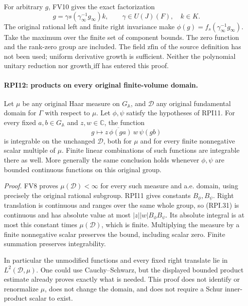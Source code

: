 For arbitrary \(g\), FV10 gives the exact factorization
\[
       g=\gamma s(\gamma_\infty^{-1}g_\infty)k,
       \qquad \gamma\in U(J)(F),\quad k\in K.
 \tag{RPI.30}
\]
The original rational left and finite right invariance
make \(\phi(g)=f_s(\gamma_\infty^{-1}g_\infty)\).
Take the maximum over the finite set of component bounds.
The zero function and the rank-zero group are included.
The field \(\mathrm{zfin}\) of the source definition has
not been used; uniform derivative growth is sufficient.
Neither the polynomial unitary reduction nor
\(\mathrm{growth\_iff}\) has entered this proof.

\paragraph{RPI12: products on every original finite-volume domain.}
\label{claim:RPI12}
Let \(\mu\) be any original Haar measure on \(G_{\mathbb A}\),
and \(\mathcal D\) any original fundamental domain for
\(\Gamma\) with respect to \(\mu\).  Let
\(\phi,\psi\) satisfy the hypotheses of RPI11.
For every fixed \(a,b\in G_{\mathbb A}\) and
\(z,w\in\mathbb C\), the function
\[
       g\longmapsto
            \overline{z\,\phi(ga)}\,w\,\psi(gb)
 \tag{RPI.31}
\]
is integrable on the unchanged \(\mathcal D\), both for
\(\mu\) and for every finite nonnegative scalar multiple
of \(\mu\).  Finite linear combinations of such functions
are integrable there as well.  More generally the same
conclusion holds whenever \(\phi,\psi\) are bounded
continuous functions on this original group.

\emph{Proof.}
FV8 proves \(\mu(\mathcal D)<\infty\) for every such
measure and a.e. domain, using precisely the original
rational subgroup.  RPI11 gives constants \(B_\phi,B_\psi\).
Right translation is continuous and ranges over the same
whole group, so (RPI.31) is continuous and has absolute
value at most
\(|z||w|B_\phi B_\psi\).
Its absolute integral is at most this constant times
\(\mu(\mathcal D)\), which is finite.
Multiplying the measure by a finite nonnegative scalar
preserves the bound, including scalar zero.  Finite
summation preserves integrability.

In particular the unmodified functions and every fixed
right translate lie in \(L^2(\mathcal D,\mu)\).
One could use Cauchy--Schwarz, but the displayed bounded
product estimate already proves exactly what is needed.
This proof does not identify or renormalize \(\mu\),
does not change the domain, and does not require a
Schur inner-product scalar to exist.

